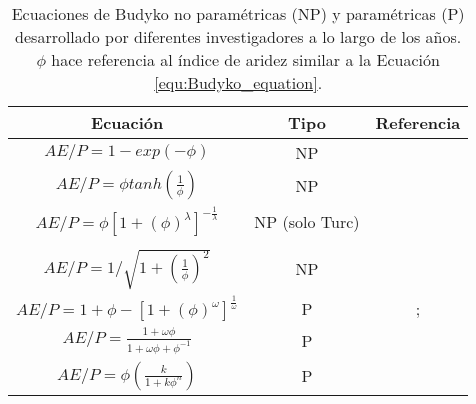 \begin{table}[ht!]
\caption{Ecuaciones de Budyko no paramétricas (NP) y paramétricas (P) desarrollado por diferentes investigadores a lo largo de los años. $\phi$ hace referencia al índice de aridez similar a la Ecuación \ref{equ:Budyko_equation}.}
\label{tab:BUDYKO_deterministic_equations}
\centering    
\begin{tabular}{ccc}
\hline
\textbf{Ecuación} & \textbf{Tipo} & \textbf{Referencia} \\ \hline
$AE/P = 1 - exp(-\phi) $  &      NP         &   \citet{schreiber1904relationship}                 \\
$AE/P = \phi tanh \left (  \frac{1}{\phi}  \right )$ &  NP              &    \citet{ol1911evaporation}                    \\
$AE/P = \phi \left [ 1 + (\phi)^{\lambda} \right ]^{-\frac{1}{\lambda}} $ &      NP (solo Turc) &    \citet[$\lambda$=2]{turc1954water} \\
 &      &  \citet{yang2008new} \\
$AE/P = 1 / \sqrt{1 + \left ( \frac{1}{\phi} \right )^{2}} $  &   NP           &      \citet{pike1964estimation}               \\
$AE/P = 1 + \phi -  \left [  1 + (\phi)^{\omega}\right ]^{\frac{1}{\omega}}$  &     P           &   \cite{Fu1981}; \citet{Zhang2004}                  \\
$AE/P = \frac{1 + \omega\phi}{1 + \omega\phi+\phi^{-1}} $  &   P             &      \citet{zhang2001response}             \\
$AE/P = \phi\left ( \frac{k}{1 + k \phi^{n}} \right ) $   &    P            &       \citet{zhou2015complementary}              \\ \hline
\end{tabular}
\end{table}